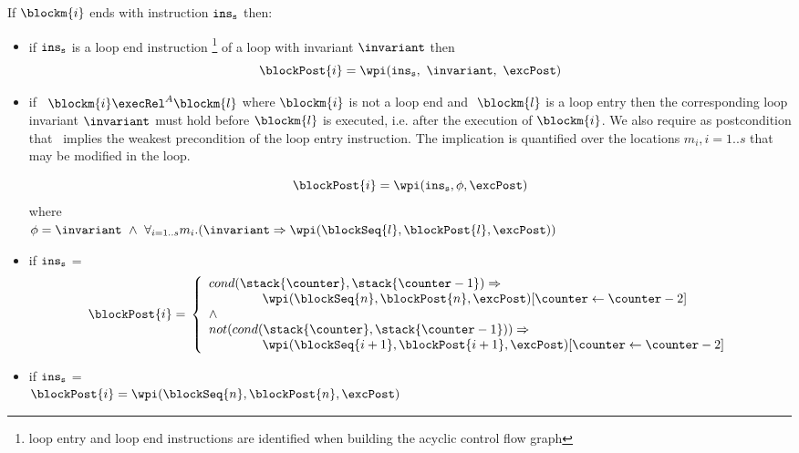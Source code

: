 \begin{defn}\label{post}
 If $\blockm{i}$ ends with instruction $\tt{ins}_s$ then:
 \begin{itemize} 

\item if  $\tt{ins}_s$ is a loop end instruction \footnote{loop entry and loop end instructions are identified when building the acyclic control flow graph} of a loop with invariant $\invariant$ then 
$$
\blockPost{i} =  \wpi( \tt{ins}_s, \ \invariant, \ \excPost ) 
$$

\item if \ $\blockm{i} \execRel^A \blockm{l}$ where $\blockm{i}$ is not a loop end and $\ \blockm{l}$ is a loop entry  then the corresponding loop invariant $\invariant$ must hold before $\blockm{l}$ is executed, i.e. after the execution of $\blockm{i}$. We also require as postcondition that \invariant \ implies the weakest precondition of the loop entry instruction. The implication is quantified over the locations $m_i , i= 1..s$ that may be modified in the loop.

$$
\blockPost{i} = \wpi(\tt{ins}_s, \phi, \excPost) \\
$$
where \\
$
\phi = \invariant \ \wedge \ \forall_{i = 1..s} m_i.(
\invariant \Rightarrow \wpi(\blockSeq{l},\blockPost{l},\excPost))
$
  
 \item if  $\tt{ins}_s$ =   \\
$$
\blockPost{i} =  \\
\left\{
\begin{array}{l}
cond( \stack{\counter}, \stack{\counter - 1} )   \Rightarrow \\
\phantom{ \counter }   \wpi(\blockSeq{n}, \blockPost{n} ,\excPost )[ \counter \leftarrow \counter -2 ]  \\
\wedge \\
 not ( cond( \stack{\counter}, \stack{\counter - 1} )  )   \Rightarrow \\
\phantom{ \counter}    \wpi(\blockSeq{i+1}, \blockPost{i+1},\excPost ) [ \counter \leftarrow \counter -2 ]      \\                             
\end{array}
\right.
$$
\item if  $\tt{ins}_s$ =   \\ 
$\blockPost{i} =  \wpi(\blockSeq{n}, \blockPost{n} , \excPost )$ \\


\end{itemize}
\end{defn}
